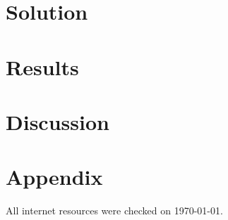 \documentclass[a4paper]{article}
\begin{document}
\clearpage

\section{Solution}



\clearpage

\section{Results}



\clearpage

\section{Discussion}



\clearpage

\section{Appendix}



\clearpage

{}

\nocite{*}
All internet resources were checked on \today.
\end{document}
